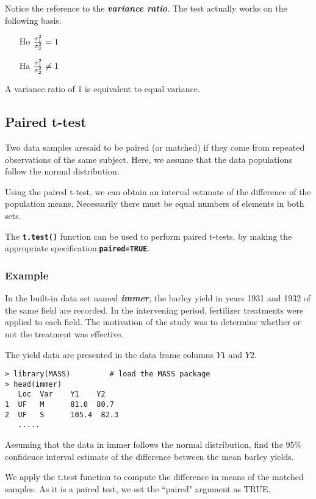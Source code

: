 Notice the reference to the \emph{\textbf{variance ratio}}. The test actually works on the following basis.

\begin{itemize}
\item[Ho] ${ \sigma^2_1 \over \sigma^2_2} = 1$
\item[Ha] ${ \sigma^2_1 \over \sigma^2_2} \neq 1$
\end{itemize}
A variance ratio of 1 is equivalent to equal variance.
\subsection{Paired t-test}
Two data samples aresaid to be paired (or matched) if they come from repeated observations of the same subject. Here, we assume that the data populations follow the normal distribution.

Using the paired t-test, we can obtain an interval estimate of the difference of the population means. Necessarily there must be equal numbers of elements in both sets.

The \textbf{\texttt{t.test()}} function can be used to perform paired t-tests, by making the appropriate specification:\textbf{\texttt{paired=TRUE}}.


\subsubsection{Example}
In the built-in data set named \textbf{\emph{immer}}, the barley yield in years 1931 and 1932 of the same field are recorded. In the intervening period, fertilizer treatments were applied to each field. The motivation of the study was to determine whether or not the treatment was effective.

The yield data are presented in the data frame columns $Y1$ and $Y2$.

\begin{verbatim}
> library(MASS)         # load the MASS package
> head(immer)
   Loc  Var    Y1    Y2
1  UF   M      81.0  80.7
2  UF   S      105.4  82.3
   .....
\end{verbatim}
Assuming that the data in immer follows the normal distribution, find the $95\%$ confidence interval estimate of the difference between the mean barley yields.

We apply the t.test function to compute the difference in means of the matched samples. As it is a paired test, we set the ``paired" argument as TRUE.

